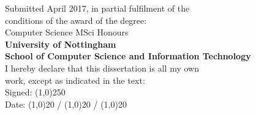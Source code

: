 \documentclass[]{article}
\newcommand{\bld}[1]{\textbf{#1}}
\begin{document}
\begin{center}
\normalsize{
Submitted April 2017, in partial fulfilment of the\\ conditions of the award of the degree:\\[\baselinestretch 0.3cm]
%
Computer Science MSci Honours\\[\baselinestretch 0.3cm]
\bld{University of Nottingham}\\ \bld{School of Computer Science and Information Technology}\\[\baselinestretch 0.3cm]
%
I hereby declare that this dissertation is all my own\\ work, except as indicated in the text:\\[\baselinestretch 0.3cm]
%
Signed: \line(1,0){250}\\[\baselinestretch 0.5cm]
Date: \line(1,0){20} / \line(1,0){20} / \line(1,0){20}
}
\end{center}
\pagebreak
\tableofcontents
\pagebreak
\listoffigures
\pagebreak
{}










\appendix
%
%
%
%
%
%

\end{document}

